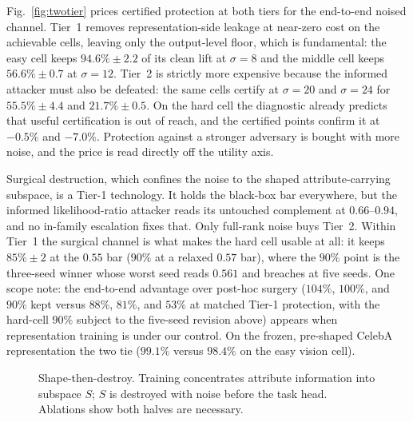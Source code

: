 \documentclass[letterpaper]{article} %
\begin{document}
Fig.~\ref{fig:twotier} prices certified protection at both tiers for
the end-to-end noised channel. Tier~1 removes
representation-side leakage at near-zero cost on the achievable cells,
leaving only the output-level floor, which is fundamental: the easy cell
keeps $94.6\% \pm 2.2$ of its clean lift at $\sigma{=}8$ and the middle
cell keeps $56.6\% \pm 0.7$ at $\sigma{=}12$. Tier~2 is strictly more
expensive because the informed attacker must also be defeated: the same
cells certify at $\sigma{=}20$ and $\sigma{=}24$ for $55.5\% \pm 4.4$ and
$21.7\% \pm 0.5$. On the hard cell the diagnostic already predicts that
useful certification is out of reach, and the certified points confirm it
at $-0.5\%$ and $-7.0\%$. Protection against a stronger adversary is
bought with more noise, and the price is read directly off the utility
axis.

Surgical destruction, which confines the noise to the shaped
attribute-carrying subspace, is a Tier-1 technology. It holds the
black-box bar everywhere, but the informed likelihood-ratio attacker
reads its untouched complement at $0.66$--$0.94$, and no in-family
escalation fixes that. Only full-rank noise buys Tier~2. Within Tier~1
the surgical channel is what makes the hard cell usable at all: it keeps
$85\% \pm 2$ at the $0.55$ bar ($90\%$ at a relaxed $0.57$ bar), where
the $90\%$ point is the three-seed winner whose worst seed reads $0.561$
and breaches at five seeds. One scope note: the end-to-end advantage over
post-hoc surgery ($104\%$, $100\%$, and $90\%$ kept versus $88\%$,
$81\%$, and $53\%$ at matched Tier-1 protection, with the hard-cell
$90\%$ subject to the five-seed revision above) appears when
representation training is under our control. On the frozen, pre-shaped
CelebA representation the two tie ($99.1\%$ versus $98.4\%$ on the easy
vision cell).

\begin{figure}[t]
\centering
{}
\caption{%
Shape-then-destroy. Training concentrates attribute information into subspace $S$; $S$ is destroyed with noise before the task head. Ablations show both halves are necessary.}
\label{fig:schematic}
\end{figure}
\end{document}
